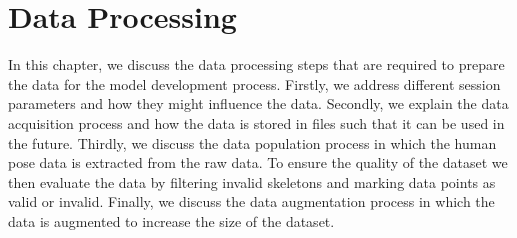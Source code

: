 \chapter{Data Processing}

In this chapter, we discuss the data processing steps that are required to prepare the data for the model development process. Firstly, we address different session parameters and how they might influence the data. Secondly, we explain the data acquisition process and how the data is stored in files such that it can be used in the future. Thirdly, we discuss the data population process in which the human pose data is extracted from the raw data. To ensure the quality of the dataset we then evaluate the data by filtering invalid skeletons and marking data points as valid or invalid. Finally, we discuss the data augmentation process in which the data is augmented to increase the size of the dataset.